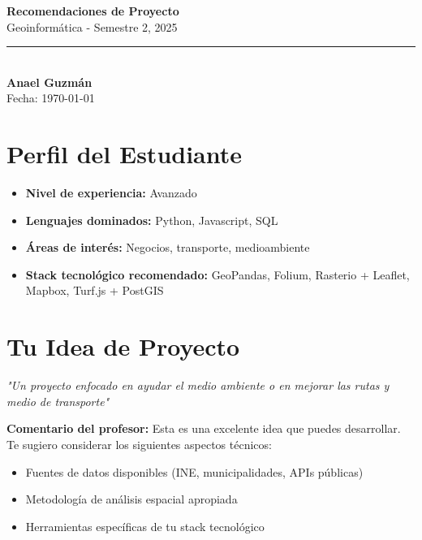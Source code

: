 \documentclass[11pt,a4paper]{article}
\begin{document}
\begin{center}
    {\Huge \textbf{Recomendaciones de Proyecto}}\\[0.5cm]
    {\Large \textcolor{usachblue}{Geoinformática - Semestre 2, 2025}}\\[0.3cm]
    \rule{\textwidth}{0.5pt}\\[0.3cm]
    {\LARGE \textbf{Anael Guzmán}}\\[0.2cm]
    {\large Fecha: \today}
\end{center}

\vspace{0.5cm}

\section*{ Perfil del Estudiante}

\begin{tcolorbox}[colback=blue!5,colframe=usachblue,title=Resumen de tu Perfil]
\begin{itemize}[leftmargin=*]
    \item \textbf{Nivel de experiencia:} Avanzado
    \item \textbf{Lenguajes dominados:} Python, Javascript, SQL
    \item \textbf{Áreas de interés:} Negocios, transporte, medioambiente
    \item \textbf{Stack tecnológico recomendado:} GeoPandas, Folium, Rasterio + Leaflet, Mapbox, Turf.js + PostGIS
\end{itemize}
\end{tcolorbox}


\section*{ Tu Idea de Proyecto}

\begin{tcolorbox}[colback=yellow!10,colframe=darkorange,title=Idea Original]
\textit{"Un proyecto enfocado en ayudar el medio ambiente o en mejorar las rutas y medio de transporte"}

\vspace{0.3cm}
\textbf{Comentario del profesor:} Esta es una excelente idea que puedes desarrollar. Te sugiero considerar los siguientes aspectos técnicos:
\begin{itemize}
    \item Fuentes de datos disponibles (INE, municipalidades, APIs públicas)
    \item Metodología de análisis espacial apropiada
    \item Herramientas específicas de tu stack tecnológico
\end{itemize}
\end{tcolorbox}
\end{document}
